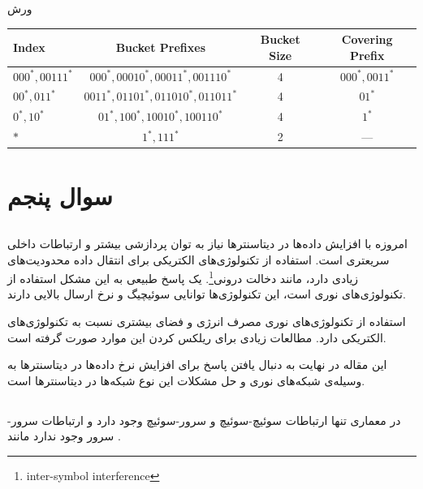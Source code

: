 \documentclass[paper=a4, fontsize=11pt]{article}
\numberwithin{equation}{section} %
\numberwithin{figure}{section} %
\numberwithin{table}{section} %
\begin{document}
\par
ورش 

\begin{center}
\begin{latin}
\begin{tabular}{ l  c  c  c }
    \hline
    Index & Bucket Prefixes & Bucket Size & Covering Prefix \\
    \hline
    $000^*, 00111^*$ & $000^*, 00010^*, 00011^*, 001110^*$ & 4 & $000^*, 0011^*$ \\
    $00^*, 011^*$ & $0011^*, 01101^*, 011010^*, 011011^*$ & 4 & $01^*$ \\
    $0^*, 10^*$ & $01^*, 100^*, 10010^*, 100110^*$ & 4 & $1^*$ \\
    $*$ & $1^*, 111^*$ & 2 & --- \\
    \hline
\end{tabular}
\end{latin}
\end{center}

\section{سوال پنجم}
\subsection{}
\par
امروزه با افزایش داده‌ها در دیتاسنترها نیاز به توان پردازشی بیشتر و ارتباطات داخلی سریعتری است.
استفاده از تکنولوژی‌های الکتریکی برای انتقال داده محدودیت‌های زیادی دارد، مانند دخالت درونی\footnote{inter-symbol interference}.
یک پاسخ طبیعی به این مشکل استفاده از تکنولوژی‌های نوری است، این تکنولوژی‌ها توانایی سوئیچیگ و نرخ ارسال
بالایی دارند.

\par
استفاده از تکنولوژی‌های نوری مصرف انرژی و فضای بیشتری نسبت به تکنولوژی‌های الکتریکی دارد.
مطالعات زیادی برای ریلکس کردن این موارد صورت گرفته است.

\par
این مقاله در نهایت به دنبال یافتن پاسخ برای افزایش نرخ داده‌ها در دیتاسنترها به وسیله‌ی شبکه‌های نوری و
حل مشکلات این نوع شبکه‌ها در دیتاسنترها است.

\subsection{}
\par
در معماری 
تنها ارتباطات سوئیچ-سوئیچ و سرور-سوئیچ وجود دارد و ارتباطات سرور-سرور وجود ندارد
مانند .
\end{document}
